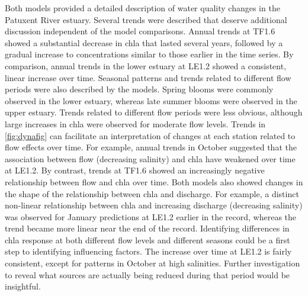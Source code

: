\documentclass{svjour3}\usepackage[]{graphicx}\usepackage[]{color}
\begin{document}
Both models provided a detailed description of water quality changes in the Patuxent River estuary.  Several trends were described that deserve additional discussion independent of the model comparisons.  Annual trends at TF1.6 showed a substantial decrease in \ac{chla} that lasted several years, followed by a gradual increase to concentrations similar to those earlier in the time series.  By comparison, annual trends in the lower estuary at LE1.2 showed a consistent, linear increase over time.  Seasonal patterns and trends related to different flow periods were also described by the models.  Spring blooms were commonly observed in the lower estuary, whereas late summer blooms were observed in the upper estuary.  Trends related to different flow periods were less obvious, although large increases in \ac{chla} were observed for moderate flow levels.  Trends in \cref{fig:dynafig} can facilitate an interpretation of changes at each station related to flow effects over time.  For example, annual trends in October suggested that the association between flow (decreasing salinity) and \ac{chla} have weakened over time at LE1.2.  By contrast, trends at TF1.6 showed an increasingly negative relationship between flow and \ac{chla} over time.  Both models also showed changes in the shape of the relationship between \ac{chla} and discharge.  For example, a distinct non-linear relationship between \ac{chla} and increasing discharge (decreasing salinity) was observed for January predictions at LE1.2 earlier in the record, whereas the trend became more linear near the end of the record. Identifying differences in \ac{chla} response at both different flow levels and different seasons could be a first step to identifying influencing factors. The increase over time at LE1.2 is fairly consistent, except for patterns in October at high salinities. Further investigation to reveal what sources are actually being reduced during that period would be insightful. 
\end{document}
